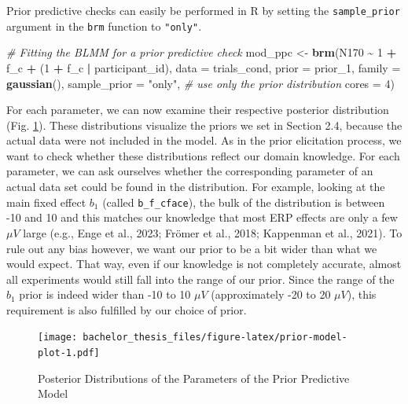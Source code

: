 \documentclass[
  doc,12pt,floatsintext]{apa7}
\newenvironment{Shaded}{\begin{snugshade}}{\end{snugshade}}
\newcommand{\AttributeTok}[1]{\textcolor[rgb]{0.13,0.29,0.53}{#1}}
\newcommand{\CommentTok}[1]{\textcolor[rgb]{0.56,0.35,0.01}{\textit{#1}}}
\newcommand{\DecValTok}[1]{\textcolor[rgb]{0.00,0.00,0.81}{#1}}
\newcommand{\FunctionTok}[1]{\textcolor[rgb]{0.13,0.29,0.53}{\textbf{#1}}}
\newcommand{\NormalTok}[1]{#1}
\newcommand{\OtherTok}[1]{\textcolor[rgb]{0.56,0.35,0.01}{#1}}
\newcommand{\SpecialCharTok}[1]{\textcolor[rgb]{0.81,0.36,0.00}{\textbf{#1}}}
\newcommand{\StringTok}[1]{\textcolor[rgb]{0.31,0.60,0.02}{#1}}
\begin{document}
Prior predictive checks can easily be performed in R by setting the \texttt{sample\_prior} argument in the \texttt{brm} function to \texttt{"only"}.

\begin{Shaded}
\begin{Highlighting}[]
\CommentTok{\# Fitting the BLMM for a prior predictive check}
\NormalTok{mod\_ppc }\OtherTok{\textless{}{-}} \FunctionTok{brm}\NormalTok{(N170 }\SpecialCharTok{\textasciitilde{}} \DecValTok{1} \SpecialCharTok{+}\NormalTok{ f\_c }\SpecialCharTok{+}\NormalTok{ (}\DecValTok{1} \SpecialCharTok{+}\NormalTok{ f\_c }\SpecialCharTok{|}\NormalTok{ participant\_id),}
               \AttributeTok{data =}\NormalTok{ trials\_cond, }
               \AttributeTok{prior =}\NormalTok{ prior\_1,}
               \AttributeTok{family =} \FunctionTok{gaussian}\NormalTok{(),}
               \AttributeTok{sample\_prior =} \StringTok{"only"}\NormalTok{, }\CommentTok{\# use only the prior distribution}
               \AttributeTok{cores =} \DecValTok{4}\NormalTok{) }
\end{Highlighting}
\end{Shaded}

For each parameter, we can now examine their respective posterior distribution (Fig. \ref{fig:prior-model-plot}). These distributions visualize the priors we set in Section 2.4, because the actual data were not included in the model. As in the prior elicitation process, we want to check whether these distributions reflect our domain knowledge. For each parameter, we can ask ourselves whether the corresponding parameter of an actual data set could be found in the distribution. For example, looking at the main fixed effect \(b_1\) (called \texttt{b\_f\_cface}), the bulk of the distribution is between -10 and 10 and this matches our knowledge that most ERP effects are only a few \(\mu V\) large (e.g., Enge et al., 2023; Frömer et al., 2018; Kappenman et al., 2021). To rule out any bias however, we want our prior to be a bit wider than what we would expect. That way, even if our knowledge is not completely accurate, almost all experiments would still fall into the range of our prior. Since the range of the \(b_1\) prior is indeed wider than -10 to 10 \(\mu V\) (approximately -20 to 20 \(\mu V\)), this requirement is also fulfilled by our choice of prior.



\begin{figure}
\centering
\texttt{[image: bachelor\_thesis\_files/figure-latex/prior-model-plot-1.pdf]}
\caption{\label{fig:prior-model-plot}Posterior Distributions of the Parameters of the Prior Predictive Model}
\end{figure}
\end{document}
